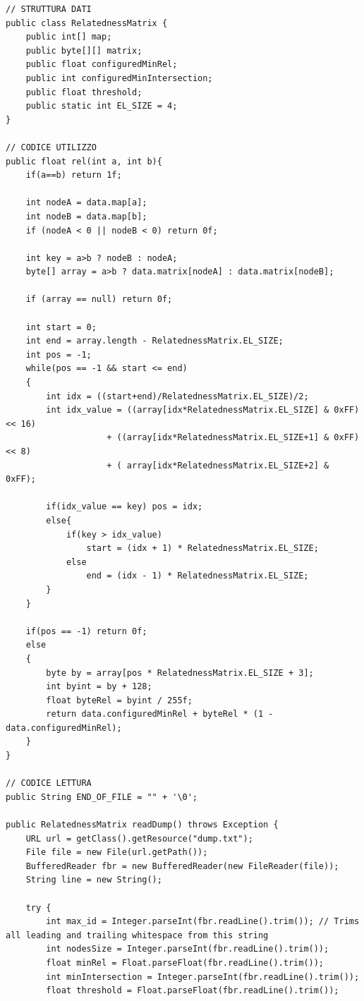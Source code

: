 \begin{lstlisting}[style=JavaStyle, caption=Implentazione nativa]
// STRUTTURA DATI
public class RelatednessMatrix {
    public int[] map;
    public byte[][] matrix;
    public float configuredMinRel;
    public int configuredMinIntersection;
    public float threshold;
    public static int EL_SIZE = 4;
}

// CODICE UTILIZZO
public float rel(int a, int b){
    if(a==b) return 1f;

    int nodeA = data.map[a];
    int nodeB = data.map[b];
    if (nodeA < 0 || nodeB < 0) return 0f;

    int key = a>b ? nodeB : nodeA;
    byte[] array = a>b ? data.matrix[nodeA] : data.matrix[nodeB];

    if (array == null) return 0f;

    int start = 0;
    int end = array.length - RelatednessMatrix.EL_SIZE;
    int pos = -1;
    while(pos == -1 && start <= end)
    {
        int idx = ((start+end)/RelatednessMatrix.EL_SIZE)/2;
        int idx_value = ((array[idx*RelatednessMatrix.EL_SIZE] & 0xFF) << 16)
                    + ((array[idx*RelatednessMatrix.EL_SIZE+1] & 0xFF) << 8)
                    + ( array[idx*RelatednessMatrix.EL_SIZE+2] & 0xFF);

        if(idx_value == key) pos = idx;
        else{
            if(key > idx_value)
                start = (idx + 1) * RelatednessMatrix.EL_SIZE;
            else
                end = (idx - 1) * RelatednessMatrix.EL_SIZE;
        }
    }

    if(pos == -1) return 0f;
    else
    {
        byte by = array[pos * RelatednessMatrix.EL_SIZE + 3];
        int byint = by + 128;
        float byteRel = byint / 255f;
        return data.configuredMinRel + byteRel * (1 - data.configuredMinRel);
    }
}

// CODICE LETTURA
public String END_OF_FILE = "" + '\0';

public RelatednessMatrix readDump() throws Exception {
    URL url = getClass().getResource("dump.txt");
    File file = new File(url.getPath());
    BufferedReader fbr = new BufferedReader(new FileReader(file));
    String line = new String();

    try {   
        int max_id = Integer.parseInt(fbr.readLine().trim()); // Trims all leading and trailing whitespace from this string         
        int nodesSize = Integer.parseInt(fbr.readLine().trim());
        float minRel = Float.parseFloat(fbr.readLine().trim());
        int minIntersection = Integer.parseInt(fbr.readLine().trim());
        float threshold = Float.parseFloat(fbr.readLine().trim());         


\end{lstlisting}
